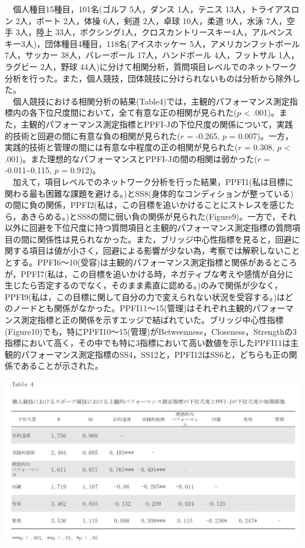 \documentclass[12pt,a4paper,xelatex,ja=standard]{bxjsarticle}
\begin{document}
　個人種目15種目，101名(ゴルフ 5人，ダンス 1人，テニス
13人，トライアスロン 2人，ボート 2人，体操 6人，剣道 2人，卓球
10人，柔道 9人，水泳 7人，空手 3人，陸上
33人，ボクシング1人，クロスカントリースキー4人，アルペンスキー3人)，団体種目4種目，118名(アイスホッケー
5人，アメリカンフットボール 7人，サッカー 38人，バレーボール
17人，ハンドボール 4人，フットサル 1人，ラグビー 2人，野球
44人)に分けて相関分析，質問項目レベルでのネットワーク分析を行った。また，個人競技，団体競技に分けられないものは分析から除外した。\\
　個人競技における相関分析の結果(Table4)では，主観的パフォーマンス測定指標内の各下位尺度間において，全て有意な正の相関が見られた(\(\mathit{p}\)
\textless{}
.001)。また，主観的パフォーマンス測定指標とPPFI-Jの下位尺度の関係について，実践的技術と回避の間に有意な負の相関が見られた(\(\mathit{r}\)
= -0.265, \(\mathit{p}\) =
0.007)。一方，実践的技術と管理の間には有意な中程度の正の相関が見られた(\(\mathit{r}\)
= 0.308, \(\mathit{p}\) \textless{}
.001)。また理想的なパフォーマンスとPPFI-Jの間の相関は弱かった(\(\mathit{r}\)
= -0.011\textasciitilde0.115, \(\mathit{p}\) = 0.912)。\\
　加えて，項目レベルでのネットワーク分析を行った結果，PPFI1(私は目標に関わる最も困難な課題を避ける。)とSS8(身体的なコンディションが整っている)の間に負の関係，PPFI2(私は，この目標を追いかけることにストレスを感じたら，あきらめる。)とSS8の間に弱い負の関係が見られた(Figure9)。一方で，それ以外に回避を下位尺度に持つ質問項目と主観的パフォーマンス測定指標の質問項目の間に関係性は見られなかった。また，ブリッジ中心性指標を見ると，回避に関する項目は値が小さく，回避による影響が少ない為，考察では解釈しないこととする。PPFI6～10(受容)は主観的パフォーマンス測定指標と関係があるところが，PPFI7(私は，この目標を追いかける時，ネガティブな考えや感情が自分に生じたら否定するのでなく，そのまま素直に認める。)のみで関係が少なく，PPFI9(私は，この目標に関して自分の力で変えられない状況を受容する。)はどのノードとも関係がなかった。PPFI11～15(管理)はそれぞれ主観的パフォーマンス測定指標と正の関係を示すエッジで結ばれていた。ブリッジ中心性指標(Figure10)でも，特にPPFI10～15(管理)がBetweenness，Closeness，Strengthの3指標において高く，その中でも特に3指標において高い数値を示したPPFI11は主観的パフォーマンス測定指標のSS4，SS12と，PPFI12はSS6と，どちらも正の関係であることが示された。
　 　 　

\includegraphics{table4.png}
\end{document}
